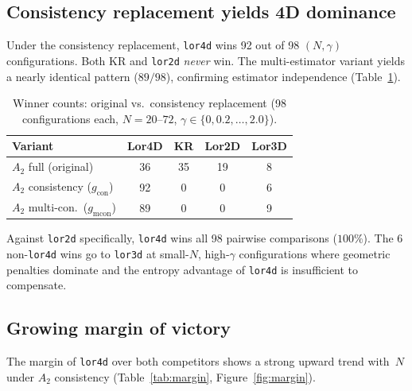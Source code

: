 \documentclass[12pt,a4paper]{article}
\begin{document}
\subsection{Consistency replacement yields 4D dominance}
\label{sec:4d_dominance}

Under the consistency replacement, \texttt{lor4d} wins 92 out of 98
$(N, \gamma)$ configurations. Both KR and \texttt{lor2d} \emph{never} win. The
multi-estimator variant yields a nearly identical pattern ($89/98$), confirming
estimator independence (Table~\ref{tab:replacement}).

\begin{table}[h]
\centering
\caption{Winner counts: original vs.\ consistency replacement (98
configurations each, $N = 20$--$72$, $\gamma \in \{0, 0.2, \ldots, 2.0\}$).}
\label{tab:replacement}
\begin{tabular}{lcccc}
\toprule
\textbf{Variant} & \textbf{Lor4D} & \textbf{KR} & \textbf{Lor2D} &
\textbf{Lor3D} \\
\midrule
$A_2$ full (original) & 36 & 35 & 19 & 8 \\
$A_2$ consistency ($g_{\text{con}}$) & 92 & 0 & 0 & 6 \\
$A_2$ multi-con.\ ($g_{\text{mcon}}$) & 89 & 0 & 0 & 9 \\
\bottomrule
\end{tabular}
\end{table}

Against \texttt{lor2d} specifically, \texttt{lor4d} wins all 98 pairwise
comparisons ($100\%$). The 6 non-\texttt{lor4d} wins go to \texttt{lor3d} at
small-$N$, high-$\gamma$ configurations where geometric penalties dominate and
the entropy advantage of \texttt{lor4d} is insufficient to compensate.

\subsection{Growing margin of victory}
\label{sec:margin}

The margin of \texttt{lor4d} over both competitors shows a strong upward trend
with~$N$ under $A_2$ consistency (Table~\ref{tab:margin},
Figure~\ref{fig:margin}).
\end{document}
